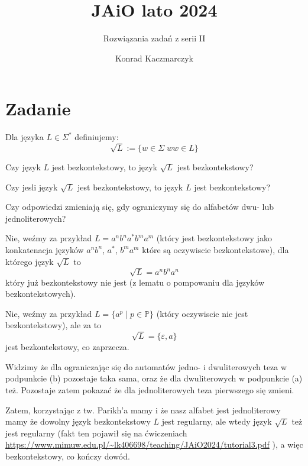 \documentclass[11pt]{scrartcl}
\author{Konrad Kaczmarczyk}
\begin{document}
  \title{JAiO lato 2024}
  \subtitle{Rozwiązania zadań z serii II}
  \maketitle
   \section{Zadanie}
       \begin{zadanie}
           Dla języka $L \in \Sigma^*$ definiujemy:
           \[
             \sqrt{L} := \{ w \in \Sigma \; ww \in L \}
           \]
           \begin{walk}
               \item Czy język $L$ jest bezkontekstowy, to język $\sqrt{L} $ jest bezkontekstowy?
                \item Czy jesli język $\sqrt{L} $ jest bezkontekstowy, to język $L$ jest bezkontekstowy?
                \item Czy odpowiedzi zmieniają się, gdy ograniczymy się do alfabetów dwu- lub jednoliterowych?
           \end{walk}
           
       \end{zadanie}
       
       \begin{walk}
           \item Nie, weźmy za przykład $L = a^n b^n a^* b^m a^m$ (który jest bezkontekstowy jako konkatenacja języków $a^n b^n$, $a^*$, $b^m a^m$ które są oczywiscie bezkontekstowe), dla którego język $\sqrt{L} $ to 
             \[
                 \sqrt{L} = a^n b^n a^n 
             \]
             który już bezkontekstowy nie jest (z lematu o pompowaniu dla języków bezkontekstowych).
           \item Nie, weźmy za przykład $L = \{ a^p \; | \; p \in \mathbb{P} \}$ (który oczywiscie nie jest bezkontekstowy), ale za to
             \[
               \sqrt{L} = \{ \varepsilon , a \} 
             \]
             jest bezkontekstowy, co zaprzecza.

          \item Widzimy że dla ograniczając się do automatów jedno- i dwuliterowych teza w podpunkcie (b) pozostaje taka sama, oraz że dla dwuliterowych w podpunkcie (a) też. Pozostaje zatem pokazać że dla jednoliterowych teza pierwszego się zmieni.

            Zatem, korzystając z tw. Parikh'a mamy i że nasz alfabet jest jednoliterowy mamy że dowolny język bezkontekstowy $L$ jest regularny, ale wtedy język $\sqrt{L} $ też jest regularny (fakt ten pojawił się na ćwiczeniach \url{https://www.mimuw.edu.pl/~lk406698/teaching/JAiO2024/tutorial3.pdf} ), a więc bezkontekstowy, co kończy dowód.
       \end{walk}
       
   
\end{document}
